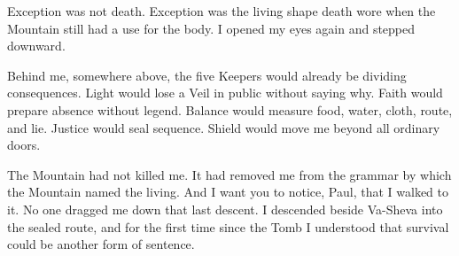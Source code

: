 Exception was not death. Exception was the living shape death wore when the Mountain still had a use for the body. I opened my eyes again and stepped downward.\par

Behind me, somewhere above, the five Keepers would already be dividing consequences. Light would lose a Veil in public without saying why. Faith would prepare absence without legend. Balance would measure food, water, cloth, route, and lie. Justice would seal sequence. Shield would move me beyond all ordinary doors.\par

The Mountain had not killed me. It had removed me from the grammar by which the Mountain named the living. And I want you to notice, Paul, that I walked to it. No one dragged me down that last descent. I descended beside Va-Sheva into the sealed route, and for the first time since the Tomb I understood that survival could be another form of sentence.\par

\ornament
